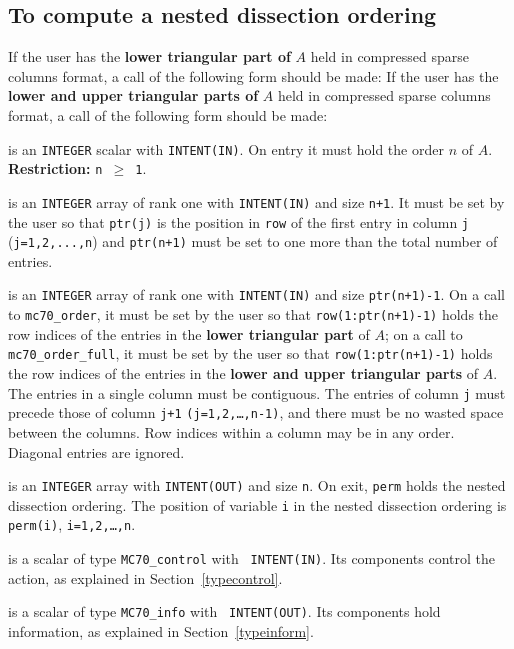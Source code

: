 \documentclass{stfc}
\begin{document}
\subsection{To compute a nested dissection ordering}
If the user has the {\bf lower triangular part of} $A$ held in 
compressed sparse columns format, a call 
of the following form should be made:
\vspace{-1.0em}
If the user has the {\bf lower and upper triangular parts of} $A$ held in 
compressed sparse columns format, a call of the following form should be made:
\vspace{-1.0em}
\begin{description}
 is an {\tt INTEGER} scalar with {\tt INTENT(IN)}.  On entry it
must hold the order $n$ of $A$.
{\bf  Restriction:} {\tt n $\ge$ \tt 1}.

 is an {\tt INTEGER} array of rank one with {\tt INTENT(IN)}
and size {\tt n+1}. It must be set by the user so that
{\tt ptr(j)} is the position in {\tt row} of the first entry in column
{\tt j} ({\tt j=1,2,...,n}) and {\tt ptr(n+1)} must be set to one more than
the total number of entries.

 is an {\tt INTEGER} array of rank one with {\tt INTENT(IN)}
and size  {\tt ptr(n+1)-1}. On a call to {\tt mc70\_order}, it must be 
set by the user so that {\tt row(1:ptr(n+1)-1)} holds the row indices of the entries in 
the {\bf lower triangular part} of $A$; on a call to 
{\tt mc70\_order\_full}, it must be 
set by the user so that {\tt row(1:ptr(n+1)-1)} holds the row indices of the entries in 
the {\bf lower and upper triangular parts} of $A.$ The entries in a single 
column must be contiguous. The entries of column {\tt j} must precede those of 
column {\tt j+1} {\tt (j=1,2,\ldots,n-1)}, and there must be no wasted space 
between the columns. Row indices within a column may be in any order. Diagonal 
entries are ignored.

 is an {\tt INTEGER} array with {\tt INTENT(OUT)} and size
{\tt n}.  On exit, {\tt perm} holds the nested dissection ordering. 
The position of variable {\tt i} in the nested dissection ordering is  {\tt perm(i)},
{\tt i=1,2,\ldots,n}.


  is a scalar of type {\tt MC70\_control} with {\tt
INTENT(IN)}.  Its components control the action, as explained in
Section~\ref{typecontrol}.

  is a scalar of type {\tt MC70\_info} with {\tt
INTENT(OUT)}.  Its components hold information, as explained in
Section~\ref{typeinform}.


\end{description}
\end{document}

